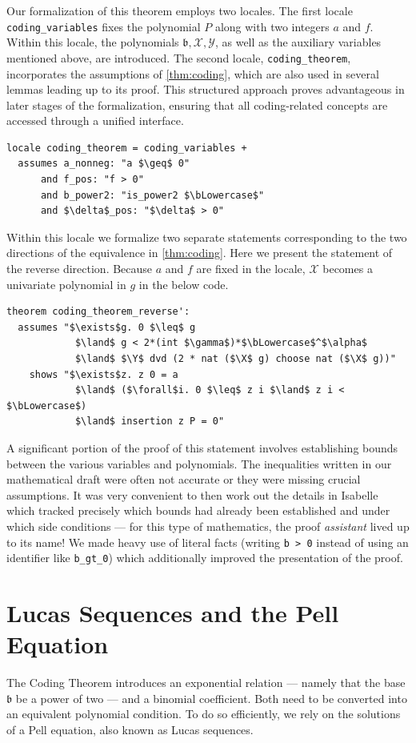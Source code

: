 \documentclass[a4paper,USenglish,cleveref,autoref,thm-restate]{lipics-v2021}
\newcommand{\thmIdec}{\mathscr}
\newcommand{\X}{\thmIdec X}
\newcommand{\Y}{\thmIdec Y}
\newcommand{\bLowercase}{\mathfrak{b}}
\begin{document}
Our formalization of this theorem employs two locales. The first locale \texttt{coding\_variables} fixes the polynomial $P$ along with two integers $a$ and $f$. Within this locale, the polynomials $\bLowercase, \X,\Y$, as well as the auxiliary variables mentioned above, are introduced. The second locale, \texttt{coding\_theorem}, incorporates the assumptions of \cref{thm:coding}, which are also used in several lemmas leading up to its proof. This structured approach proves advantageous in later stages of the formalization, ensuring that all coding-related concepts are accessed through a unified interface. 
\begin{lstlisting}
locale coding_theorem = coding_variables + 
  assumes a_nonneg: "a $\geq$ 0"
      and f_pos: "f > 0"
      and b_power2: "is_power2 $\bLowercase$"
      and $\delta$_pos: "$\delta$ > 0"
\end{lstlisting}

Within this locale we formalize two separate statements corresponding to the two directions of the equivalence in \cref{thm:coding}. Here we present the statement of the reverse direction. Because $a$ and $f$ are fixed in the locale, $\X$ becomes a univariate polynomial in $g$ in the below code.
\begin{lstlisting}
theorem coding_theorem_reverse':
  assumes "$\exists$g. 0 $\leq$ g 
            $\land$ g < 2*(int $\gamma$)*$\bLowercase$^$\alpha$ 
            $\land$ $\Y$ dvd (2 * nat ($\X$ g) choose nat ($\X$ g))"
    shows "$\exists$z. z 0 = a 
            $\land$ ($\forall$i. 0 $\leq$ z i $\land$ z i < $\bLowercase$) 
            $\land$ insertion z P = 0"
\end{lstlisting}

A significant portion of the proof of this statement involves establishing bounds between the various variables and polynomials. The inequalities written in our mathematical draft were often not accurate or they were missing crucial assumptions. It was very convenient to then work out the details in Isabelle which tracked precisely which bounds had already been established and under which side conditions --- for this type of mathematics, the proof \emph{assistant} lived up to its name! We made heavy use of literal facts (writing \texttt{\guilsinglleft b > 0\guilsinglright} instead of using an identifier like \texttt{b\_gt\_0}) which additionally improved the presentation of the proof. 

\section{Lucas Sequences and the Pell Equation}
The Coding Theorem introduces an exponential relation --- namely that the base $\bLowercase$ be a power of two --- and a binomial coefficient. Both need to be converted into an equivalent polynomial condition. To do so efficiently, we rely on the solutions of a Pell equation, also known as Lucas sequences. 
\end{document}
